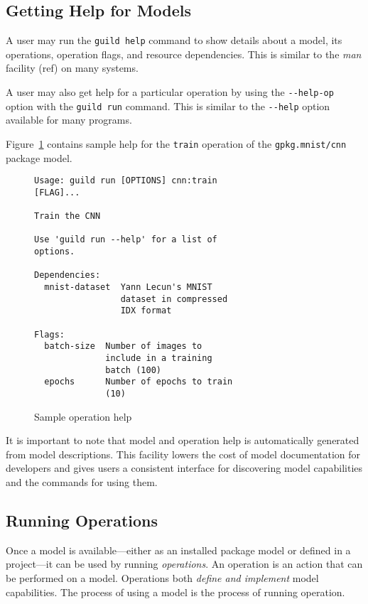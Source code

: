 \documentclass{article}
\begin{document}
\subsection{Getting Help for Models}

A user may run the \verb|guild help| command to show details about a
model, its operations, operation flags, and resource
dependencies. This is similar to the \emph{man} facility (ref) on many
systems.

A user may also get help for a particular operation by using the
\verb|--help-op| option with the \verb|guild run| command. This is
similar to the \verb|--help| option available for many programs.

Figure~\ref{fig:op-help} contains sample help for the \verb|train|
operation of the \verb|gpkg.mnist/cnn| package model.

\begin{figure}
\begin{lstlisting}
Usage: guild run [OPTIONS] cnn:train
[FLAG]...

Train the CNN

Use 'guild run --help' for a list of
options.

Dependencies:
  mnist-dataset  Yann Lecun's MNIST
                 dataset in compressed
                 IDX format

Flags:
  batch-size  Number of images to
              include in a training
              batch (100)
  epochs      Number of epochs to train
              (10)
\end{lstlisting}
\caption{Sample operation help}
\label{fig:op-help}
\end{figure}

It is important to note that model and operation help is automatically
generated from model descriptions. This facility lowers the cost of
model documentation for developers and gives users a consistent
interface for discovering model capabilities and the commands for
using them.

\subsection{Running Operations}

Once a model is available---either as an installed package model or
defined in a project---it can be used by running \emph{operations}. An
operation is an action that can be performed on a model. Operations
both \emph{define and implement} model capabilities. The process of
using a model is the process of running operation.
\end{document}
